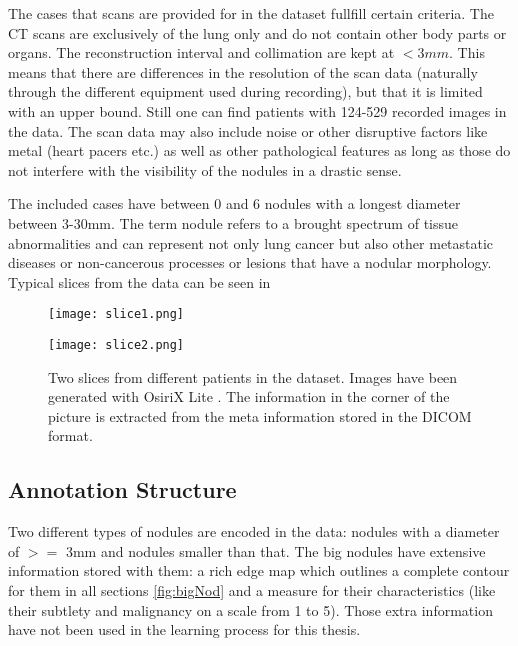 \documentclass[../Thesis.tex]{subfiles}
\begin{document}
The cases that scans are provided for in the dataset fullfill certain criteria. The CT scans are exclusively of the lung only and do not contain other body parts or organs. The  reconstruction interval and collimation are kept at $<3mm$. This means that there are differences in the resolution of the scan data (naturally through the different equipment used during recording), but that it is limited with an upper bound. Still one can find patients with 124-529 recorded images in the data. The scan data may also include noise or other disruptive factors like metal (heart pacers etc.) as well as other pathological features as long as those do not interfere with the visibility of the nodules in a drastic sense.

The included cases have between 0 and 6 nodules with a longest diameter between 3-30mm. The term nodule refers to a brought spectrum of tissue abnormalities and can represent not only lung cancer but also other metastatic diseases or non-cancerous processes or lesions that have a nodular morphology. Typical slices from the data can be seen in 

\begin{figure}[!tbp]
\centering
\begin{minipage}[b]{0.7\textwidth}
	\texttt{[image: slice1.png]}
\end{minipage}
\begin{minipage}[b]{0.7\textwidth}
	\texttt{[image: slice2.png]}
\end{minipage}
\caption{Two slices from different patients in the dataset. Images have been generated with OsiriX Lite \cite{rosset2004osirix}. The information in the corner of the picture is extracted from the meta information stored in the DICOM format.}
\label{fig:slices}
\end{figure}

\subsection{Annotation Structure}
Two different types of nodules are encoded in the data: nodules with a diameter of $>=$ 3mm and nodules smaller than that. The big nodules have extensive information stored with them: a rich edge map which outlines a complete contour for them in all sections \ref{fig:bigNod} and a measure for their characteristics (like their subtlety and malignancy on a scale from 1 to 5). Those extra information have not been used in the learning process for this thesis.
\end{document}
